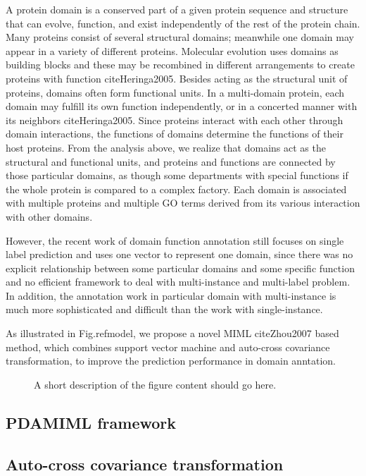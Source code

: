 \documentclass{bmcart}
\begin{document}
A protein domain is a conserved part of a given protein sequence and structure that can evolve, function, and exist independently of the rest of the protein chain. Many proteins consist of several structural domains; meanwhile one domain may appear in a variety of different proteins. Molecular evolution uses domains as building blocks and these may be recombined in different arrangements to create proteins with function cite{Heringa2005}. Besides acting as the structural unit of proteins, domains often form functional units. In a multi-domain protein, each domain may fulfill its own function independently, or in a concerted manner with its neighbors cite{Heringa2005}. Since proteins interact with each other through domain interactions, the functions of domains determine the functions of their host proteins. From the analysis above, we realize that domains act as the structural and functional units, and proteins and functions are connected by those particular domains, as though some departments with special functions if the whole protein is compared to a complex factory. Each domain is associated with multiple proteins and multiple GO terms derived from its various interaction with other domains.

However, the recent work of domain function annotation still focuses on single label prediction and uses one vector to represent one domain, since there was no explicit relationship between some particular domains and some specific function and no efficient framework to deal with multi-instance and multi-label problem. In addition, the annotation work in particular domain with multi-instance is much more sophisticated and difficult than the work with single-instance.

As illustrated in Fig.ref{model}, we propose a novel MIML cite{Zhou2007} based method, which combines support vector machine and auto-cross covariance transformation, to improve the prediction performance in domain anntation.

  \begin{figure}[h!]
  \caption{
      A short description of the figure content
      should go here.}
  \end{figure}
  

\subsection*{PDAMIML framework}

\subsection*{Auto-cross covariance transformation}
\end{document}
